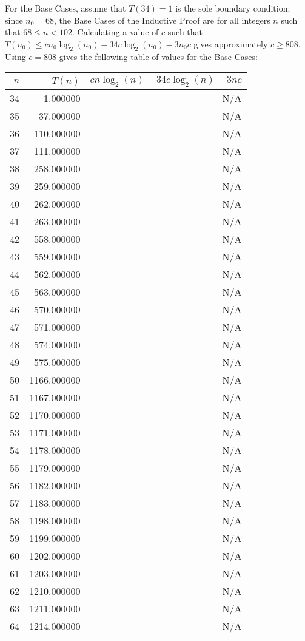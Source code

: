 \documentclass{article}
\begin{document}
For the Base Cases, assume that $T(34) = 1$ is the sole boundary condition; since $n_0 = 68$, the Base Cases of the Inductive Proof are for all integers $n$ such that $68 \leq n < 102$.  Calculating a value of $c$ such that $T(n_0) \leq cn_0\log_2(n_0) - 34c\log_2(n_0) - 3n_0c$ gives approximately $c \geq 808$.  Using $c = 808$ gives the following table of values for the Base Cases:
\begin{longtable}{r|r|r}
	$n$ & $T(n)$ & $cn\log_2(n) - 34c\log_2(n) - 3nc$ \\ \hline
	 34 &    1.000000 & N/A \\
	 35 &   37.000000 & N/A \\
	 36 &  110.000000 & N/A \\
	 37 &  111.000000 & N/A \\
	 38 &  258.000000 & N/A \\
	 39 &  259.000000 & N/A \\
	 40 &  262.000000 & N/A \\
	 41 &  263.000000 & N/A \\
	 42 &  558.000000 & N/A \\
	 43 &  559.000000 & N/A \\
	 44 &  562.000000 & N/A \\
	 45 &  563.000000 & N/A \\
	 46 &  570.000000 & N/A \\
	 47 &  571.000000 & N/A \\
	 48 &  574.000000 & N/A \\
	 49 &  575.000000 & N/A \\
	 50 & 1166.000000 & N/A \\
	 51 & 1167.000000 & N/A \\
	 52 & 1170.000000 & N/A \\
	 53 & 1171.000000 & N/A \\
	 54 & 1178.000000 & N/A \\
	 55 & 1179.000000 & N/A \\
	 56 & 1182.000000 & N/A \\
	 57 & 1183.000000 & N/A \\
	 58 & 1198.000000 & N/A \\
	 59 & 1199.000000 & N/A \\
	 60 & 1202.000000 & N/A \\
	 61 & 1203.000000 & N/A \\
	 62 & 1210.000000 & N/A \\
	 63 & 1211.000000 & N/A \\
	 64 & 1214.000000 & N/A \\

\end{longtable}
\end{document}
